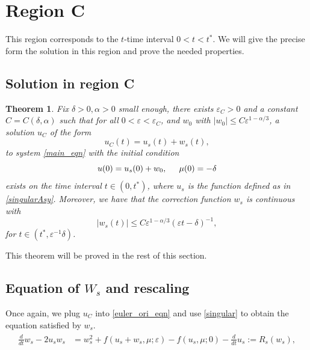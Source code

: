 \documentclass[letterpaper,11pt]{article}
\newcommand{\eps}{\varepsilon}
\numberwithin{equation}{section}
\theoremstyle{plain}
\newtheorem{theorem}{Theorem}[section]
\begin{document}
\section{Region C}\label{sec_C}
This region corresponds to the $t$-time interval $0<t<t^*$. We will give the precise form the solution in this region and prove the needed properties.

\subsection{Solution in region C}
\begin{theorem}\label{thm:s}
Fix $\delta>0, \alpha>0$ small enough, there exists $\eps_C>0$ and a constant $C=C(\delta,\alpha)$ such that for all $0<\eps <\eps_C$, and $w_0$ with $|w_0| \le  C\eps^{1-\alpha/3}$, a solution $u_C$ of the form 
\begin{equation}
u_C(t) = u_s(t) + w_s(t),
\end{equation}
to system \eqref{main_eqn} with the initial condition
\begin{equation}\label{us_ic}
u(0) = u_s(0) + w_0, \hspace{0.2in}\mu(0) =  -\delta
\end{equation}
exists on the time interval $t \in (0, t^*)$, where $u_s$ is the function defined as in \eqref{singularAsy}. Moreover, we have that the correction function $w_s$ is continuous with
\begin{equation}\label{thm:s_1}
|w_s(t)| \le C\eps^{1-\alpha/3} (\eps t -\delta)^{-1},
\end{equation}
for $t \in (t^*, \eps^{-1}\delta)$.
\end{theorem}


This theorem will be proved in the rest of this section.

\subsection{Equation of \texorpdfstring{$W_{s}$}{Ws} and rescaling }

Once again, we plug $u_C$ into \eqref{euler_ori_eqn} and use \eqref{singular} to obtain the equation satisfied by $w_s$.
\begin{align}\label{Eqn_ws}
\begin{split}
\frac{d}{dt} w_{s} -2u_sw_s &=   w_s^2 + f(u_s+w_s, \mu; \eps)-f(u_s, \mu; 0) - \frac{d}{dt}u_s:= R_s(w_s),
\end{split}
\end{align}
\end{document}
